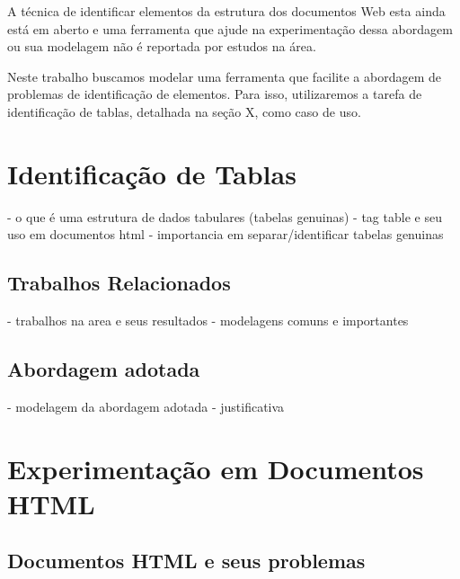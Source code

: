 \documentclass{acm_proc_article-sp}
\newcommand{\remove}[1]{}
\numberwithin{equation}{section}
\begin{document}
A técnica de identificar elementos da estrutura dos documentos Web esta
ainda está em aberto e uma ferramenta que ajude na experimentação dessa
abordagem ou sua modelagem não é reportada por estudos na área.

Neste trabalho buscamos modelar uma ferramenta que facilite a abordagem
de problemas de identificação de elementos. Para isso,
utilizaremos a tarefa de identificação de tablas, detalhada na seção X,
como caso de uso.

\remove{
Embora estudos como \cite{}... apresentem resutados "interessantes" na detecção de templates, 
}

\section{Identificação de Tablas}

- o que é uma estrutura de dados tabulares (tabelas genuinas)
- tag table e seu uso em documentos html
- importancia em separar/identificar tabelas genuinas

  \subsection{Trabalhos Relacionados}

- trabalhos na area e seus resultados
- modelagens comuns e importantes

  \subsection{Abordagem adotada}

- modelagem da abordagem adotada
- justificativa


\section{Experimentação em Documentos HTML}

  \subsection{Documentos HTML e seus problemas}
\end{document}
